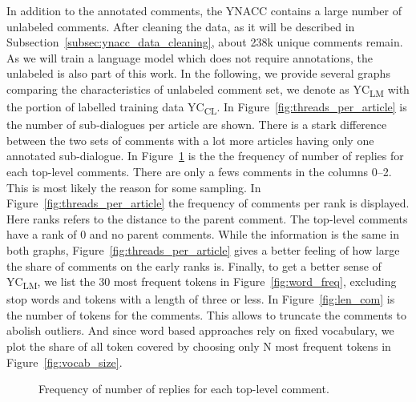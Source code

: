 In addition to the annotated comments, the YNACC contains a large number of unlabeled comments.
After cleaning the data, as it will be described in Subsection~\ref{subsec:ynacc_data_cleaning}, about 238k unique comments remain.
As we will train a language model which does not require annotations, the unlabeled is also part of this work.
In the following, we provide several graphs comparing the characteristics of unlabeled comment set, we denote as YC\textsubscript{LM} with the portion of labelled training data YC\textsubscript{CL}.
In Figure~\ref{fig:threads_per_article} is the number of sub-dialogues per article are shown.
There is a stark difference between the two sets of comments with a lot more articles having only one annotated sub-dialogue. In Figure~\ref{fig:replies_per_thread} is the the frequency of number of replies for each top-level comments.
There are only a fews comments in the columns 0--2.
This is most likely the reason for some sampling. In Figure~\ref{fig:threads_per_article} the frequency of comments per rank is displayed. Here ranks refers to the distance to the parent comment. The top-level comments have a rank of 0 and no parent comments. While the information is the same in both graphs, Figure~\ref{fig:threads_per_article} gives a better feeling of how large the share of comments on the early ranks is. Finally, to get a better sense of YC\textsubscript{LM}, we list the 30 most frequent tokens in Figure~\ref{fig:word_freq}, excluding stop words and tokens with a length of three or less.
In Figure~\ref{fig:len_com} is the number of tokens for the comments. This allows to truncate the comments to abolish outliers. And since word based approaches rely on fixed vocabulary, we plot the share of all token covered by choosing only N most frequent tokens in Figure~\ref{fig:vocab_size}.

\begin{figure}
    \centering
    \caption{Frequency of number of replies for each top-level comment.}
    \label{fig:replies_per_thread}
\end{figure}

